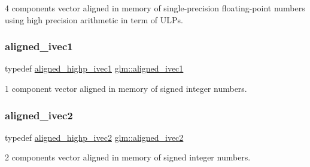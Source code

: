 4 components vector aligned in memory of single-\/precision floating-\/point numbers using high precision arithmetic in term of U\+L\+Ps. 

\mbox{\label{group__gtc__type__aligned_gafe9657c41fa58e912f99e92284d79fce}} 
\subsubsection{\texorpdfstring{aligned\+\_\+ivec1}{aligned\_ivec1}}
{\footnotesize\ttfamily typedef \hyperlink{group__gtc__type__aligned_ga90ebad7148156f223d4743091c9870d5}{aligned\+\_\+highp\+\_\+ivec1} \hyperlink{group__gtc__type__aligned_gafe9657c41fa58e912f99e92284d79fce}{glm\+::aligned\+\_\+ivec1}}



1 component vector aligned in memory of signed integer numbers. 

\mbox{\label{group__gtc__type__aligned_ga2a709e1d21f3aae3f8d6de910f5fdff4}} 
\subsubsection{\texorpdfstring{aligned\+\_\+ivec2}{aligned\_ivec2}}
{\footnotesize\ttfamily typedef \hyperlink{group__gtc__type__aligned_ga34105808a80ef5dabd7807997dfef328}{aligned\+\_\+highp\+\_\+ivec2} \hyperlink{group__gtc__type__aligned_ga2a709e1d21f3aae3f8d6de910f5fdff4}{glm\+::aligned\+\_\+ivec2}}



2 components vector aligned in memory of signed integer numbers. 

\mbox{\label{group__gtc__type__aligned_gabbf85e492d39baef3a418c15c996ab65}} 
